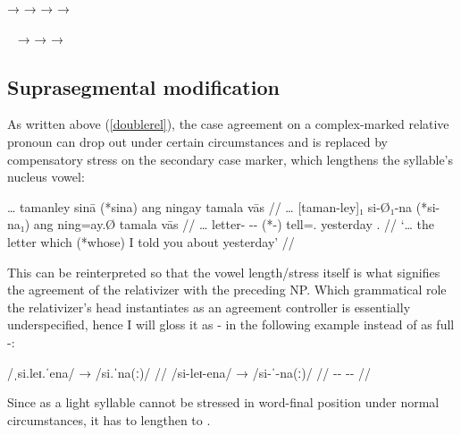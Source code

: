 \pex
	\a {} →  \label{ex:regdim}
	\a {} →  
		\label{ex:otherredupnn}
	\a {} → 
		 \label{ex:otherredupadj}
	\a {} →  
		\label{ex:otherredupvb}
\xe

\pex~\label{ex:adjredup}
	\a {} → 
	\a {} → 
	\a {} → 
\xe

\subsection{Suprasegmental modification}

As written above (\autoref{doublerel}), the case agreement on a complex-marked 
relative pronoun can drop out under certain 
circumstances and is replaced by compensatory stress on the secondary case 
marker, which lengthens the syllable's nucleus vowel:

\ex\begingl
	\gla … tamanley sinā (*sina) ang ningay tamala vās //
	\glb … [taman-ley]₁ si-Ø₁-na (*si-na₁) ang ning=ay.Ø tamala vās //
	\glc … letter-\PargI{} \Rel{}-\PatTI{}-\Gen{} (*\Rel{}-\Gen{}) \AgtT{} 
		tell=\Fsg{}.\Top{} yesterday \Ssg{}.\Parg{} //
	\glft `… the letter which (*whose) I told you about yesterday' //
\endgl\xe

This can be reinterpreted so that the vowel length/stress itself is what 
signifies the agreement of the relativizer with the preceding NP. Which 
grammatical role the relativizer's head instantiates as an agreement controller
is essentially underspecified, hence I will gloss it as -\Agr{} in the 
following example instead of as full -\PargI{}:

\ex[everygla=\upshape]\begingl
	\gla /ˌsi.leɪ.ˈena/ → /si.ˈna(ː)/ //
	\glb /si-leɪ-ena/ → /si-ˈ-na(ː)/ //
	\glc \Rel{}-\PargI{}-\Gen{} {} \Rel{}-\Agr{}-\Gen{} //
\endgl\xe

Since  as a light syllable cannot be stressed in word-final 
position under normal circumstances, it has to lengthen to .

